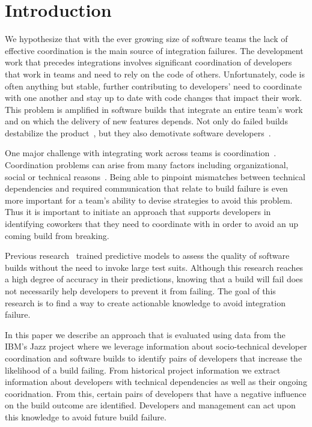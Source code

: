\documentclass[conference]{IEEEtran}
\begin{document}
\IEEEpeerreviewmaketitle

\section{Introduction}
We hypothesize that with the ever growing size of software teams the lack of
effective coordination is the main source of integration failures. The
development work that precedes integrations involves significant coordination of
developers that work in teams and need to rely on the code of others. 
Unfortunately, code is often anything but stable, further contributing to developers' need to coordinate with one another and stay up to date with code changes that impact their work.
This problem is
amplified in software builds that integrate an entire team's work
and on which the delivery of new features depends. Not only do
failed builds destabilize the product~\cite{cusumano1997}, but they also demotivate
software developers~\cite{holck2004}.

One major challenge with integrating work across teams is coordination~\cite{cataldo:esem:2008}.
Coordination problems can arise from many factors including organizational,
social or technical reasons~\cite{herbsleb:icse:1999}. Being able to pinpoint
mismatches between technical dependencies and required communication that
relate to build failure is even more important for a team's
ability to devise strategies to avoid this problem.
Thus it is important to initiate an approach that supports developers in identifying coworkers that they need to coordinate with in order to avoid an up coming build from breaking.

Previous
research~\cite{wolf:icse:2009,hassan:ase:2006} trained predictive models to assess the quality of software builds without the need to invoke large test
suits. Although this research
reaches a high degree of accuracy in their predictions, knowing that a
build will fail does not necessarily help developers to prevent it from failing.
The goal of this research is to find a way to create actionable knowledge to avoid
integration failure.

In this paper we describe an approach that is evaluated using data from the IBM's Jazz project where we leverage
information about socio-technical developer coordination and software builds to
identify pairs of developers that increase the likelihood of a build failing. From historical project information we extract information about developers with technical dependencies
as well as their ongoing cooridnation.
From this, certain pairs of developers that have a negative influence on the build outcome are identified. Developers and management can
act upon this knowledge to avoid future build failure.
\end{document}
